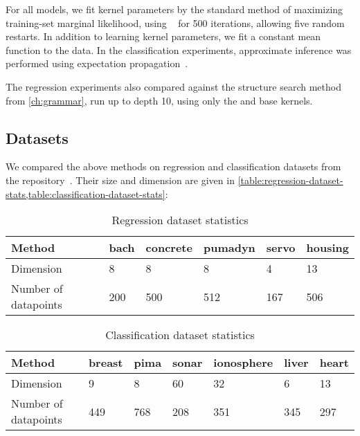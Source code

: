 For all \gp{} models, we fit kernel parameters by the standard method of maximizing training-set marginal likelihood, using \LBFGS{}~\citep{nocedal1980updating} for 500 iterations, allowing five random restarts.
In addition to learning kernel parameters, we fit a constant mean function to the data.
In the classification experiments, approximate \gp{} inference was performed using expectation propagation~\citep{minka2001expectation}.

The regression experiments also compared against the structure search method from \cref{ch:grammar}, run up to depth 10, using only the \SE{} and \RQ{} base kernels.



\subsection{Datasets}
\label{sec:additive-datasets}
We compared the above methods on regression and classification datasets from the \UCI{} repository~\citep{UCI}.
Their size and dimension are given in \cref{table:regression-dataset-stats,table:classification-dataset-stats}:

\begin{table}[h]
\caption{Regression dataset statistics}
\label{tbl:Regression Dataset Statistics}
\begin{center}
\begin{tabular}{l | lllll}
Method & bach & concrete & pumadyn & servo & housing \\ \hline
Dimension      & 8    & 8        & 8       & 4     & 13 \\
Number of datapoints       & 200  & 500      & 512     & 167   & 506
\end{tabular}
\end{center}
\label{table:regression-dataset-stats}
\end{table}
%
\begin{table}[h]
\caption{Classification dataset statistics}
\label{tbl:Classification Dataset Statistics}
\begin{center}
\begin{tabular}{l | llllll}
Method & breast & pima & sonar & ionosphere & liver & heart\\ \hline
Dimension      & 9      & 8    & 60    & 32         & 6     & 13 \\
Number of datapoints      & 449    & 768  & 208   & 351        & 345   & 297
\end{tabular}
\end{center}
\label{table:classification-dataset-stats}
\end{table}


